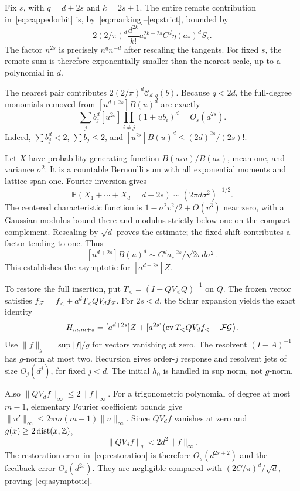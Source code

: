 \documentclass[11pt,a4paper]{article}
\theoremstyle{remark}\newtheorem*{ednote}{Editorial note (ProveIt, 2026-10-01)}
\begin{document}
Fix $s$, with $q=d+2s$ and $k=2s+1$. The entire remote contribution in~\eqref{eq:cappedorbit} is, by~\eqref{eq:marking}--\eqref{eq:strict}, bounded by
\begin{equation}\label{eq:remote}
2(2/\pi)^d\frac{d^{2k}}{k!}a_*^{2k-2s}C^d\eta(a_*)^dS_s.
\end{equation}
The factor $n^{2s}$ is precisely $n^q n^{-d}$ after rescaling the tangents. For fixed $s$, the remote sum is therefore exponentially smaller than the nearest scale, up to a polynomial in $d$.

The nearest pair contributes $2(2/\pi)^d\mathcal C_{d,q}(b)$. Because $q<2d$, the full-degree monomials removed from $[u^{d+2s}]B(u)^d$ are exactly
\[
\sum_jb_j^d[u^{2s}]\prod_{i\ne j}(1+ub_i)^d=O_s(d^{2s}).
\]
Indeed, $\sum b_j^d<2$, $\sum b_j\le2$, and $[u^{2s}]B(u)^d\le(2d)^{2s}/(2s)!$.

Let $X$ have probability generating function $B(a_*u)/B(a_*)$, mean one, and variance $\sigma^2$. It is a countable Bernoulli sum with all exponential moments and lattice span one. Fourier inversion gives
\[
\mathbb P(X_1+\cdots+X_d=d+2s)\sim(2\pi d\sigma^2)^{-1/2}.
\]
The centered characteristic function is $1-\sigma^2v^2/2+O(v^3)$ near zero, with a Gaussian modulus bound there and modulus strictly below one on the compact complement. Rescaling by $\sqrt d$ proves the estimate; the fixed shift contributes a factor tending to one. Thus
\begin{equation}\label{eq:nearest}
[u^{d+2s}]B(u)^d\sim C^da_*^{-2s}/\sqrt{2\pi d\sigma^2}.
\end{equation}
This establishes the asymptotic for $[a^{d+2s}]Z$.

To restore the full insertion, put $T_{<}=(I-QV_{<}Q)^{-1}$ on $Q$. The frozen vector satisfies $f_{\mathcal F}=f_{<}+a^dT_{<}QV_df_{\mathcal F}$. For $2s<d$, the Schur expansion yields the exact identity
\begin{equation}\label{eq:restoration}
H_{m,m+s}=[a^{d+2s}]Z+[a^{2s}]\bigl(\operatorname{ev} T_{<}QV_df_{<}-\mathcal F\mathcal G\bigr).
\end{equation}
Use $\|f\|_g=\sup|f|/g$ for vectors vanishing at zero. The resolvent $(I-A)^{-1}$ has $g$-norm at most two. Recursion gives order-$j$ response and resolvent jets of size $O_j(d^j)$, for fixed $j<d$. The initial $h_0$ is handled in sup norm, not $g$-norm.

Also $\|QV_df\|_\infty\le2\|f\|_\infty$. For a trigonometric polynomial of degree at most $m-1$, elementary Fourier coefficient bounds give $\|u'\|_\infty\le2\pi m(m-1)\|u\|_\infty$. Since $QV_df$ vanishes at zero and $g(x)\ge2\operatorname{dist}(x,\mathbb Z)$,
\[
\|QV_df\|_g<2d^2\|f\|_\infty.
\]
The restoration error in~\eqref{eq:restoration} is therefore $O_s(d^{2s+2})$ and the feedback error $O_s(d^{2s})$. They are negligible compared with $(2C/\pi)^d/\sqrt d$, proving~\eqref{eq:asymptotic}.
\end{document}
